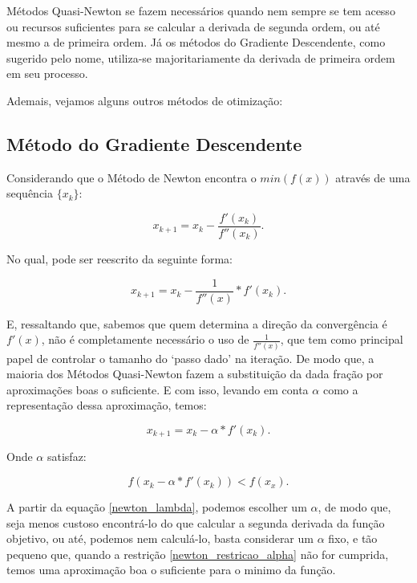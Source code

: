 Métodos Quasi-Newton se fazem necessários quando nem sempre se tem acesso ou
recursos suficientes para se calcular a derivada de segunda ordem, ou até mesmo
a de primeira ordem. Já os métodos do Gradiente Descendente, como sugerido pelo
nome, utiliza-se majoritariamente da derivada de primeira ordem em seu processo.

Ademais, vejamos alguns outros métodos de otimização:

\subsection{Método do Gradiente Descendente}

Considerando que o Método de Newton encontra o \(min(f(x))\) através de uma
sequência \(\{x_k\}\):

\begin{equation}
    x_{k+1} = x_{k} - \frac {f'(x_{k})}{f''(x_{k})}.
\end{equation}

No qual, pode ser reescrito da seguinte forma:

\begin{equation}
    x_{k+1} = x_{k} -  \frac{1}{f''(x)} * f'(x_{k}).
\end{equation}

E, ressaltando que, sabemos que quem determina a direção da convergência é
\(f'(x)\), não é completamente necessário o uso de \( \frac{1}{f''(x)} \), que
tem como principal papel de controlar o tamanho do `passo dado' na iteração.
De modo que, a maioria dos Métodos Quasi-Newton fazem a substituição
da dada fração por aproximações boas o suficiente. E com isso, levando em
conta $\alpha$ como a representação dessa aproximação, temos:

\begin{equation}
    x_{k+1} = x_{k} -  \alpha * f'(x_{k}).
    \label{newton_lambda}
\end{equation}

Onde \(\alpha\) satisfaz:

\begin{equation}
    f(x_{k} -  \alpha * f'(x_{k})) < f(x_{x}).
    \label{newton_restricao_alpha}
\end{equation}

A partir da equação \ref{newton_lambda}, podemos escolher um \(\alpha\), de
modo que, seja menos custoso encontrá-lo do que calcular a segunda derivada
da função objetivo, ou até, podemos nem calculá-lo, basta considerar
um \(\alpha\) fixo, e tão pequeno que, quando a restrição
\ref{newton_restricao_alpha} não for cumprida, temos uma aproximação boa o
suficiente para o minimo da função.

